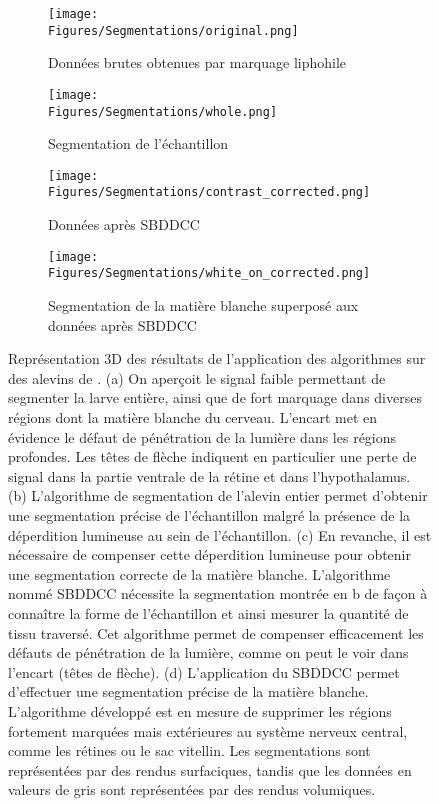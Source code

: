 \documentclass[\main/main.tex]{subfiles}
\begin{document}
\begin{figure}[h!]
    \centering
    \begin{subfigure}[b]{0.45\textwidth}
       \caption{
            \label{fig:lempereur_info:brut}
            Données brutes obtenues par marquage liphohile
            }
       \centering \texttt{[image: \\Figures/Segmentations/original.png]}
    \end{subfigure}
    \begin{subfigure}[b]{0.45\textwidth}
       \caption{
        \label{fig:lempereur_info:whole}
        Segmentation de l'échantillon
        }
       \centering \texttt{[image: \\Figures/Segmentations/whole.png]}
    \end{subfigure}
    \begin{subfigure}[b]{0.45\textwidth}
       \caption{
           \label{fig:lempereur_info:correction}
           Données après SBDDCC
        }
       \centering \texttt{[image: \\Figures/Segmentations/contrast\_corrected.png]}
    \end{subfigure}
    \begin{subfigure}[b]{0.45\textwidth}
       \caption{
           \label{fig:lempereur_info:white}
            Segmentation de la matière blanche superposé aux données après SBDDCC
            }
       \centering \texttt{[image: \\Figures/Segmentations/white\_on\_corrected.png]}
    \end{subfigure}
    \caption{
        \label{fig:lempereur_info}
        Représentation 3D des résultats de l'application des algorithmes sur des alevins de \pz{}.
        \newline
        (a) On aperçoit le signal faible permettant de segmenter la larve entière, ainsi que de fort marquage dans diverses régions dont la matière blanche du cerveau. L'encart met en évidence le défaut de pénétration de la lumière dans les régions profondes. Les têtes de flèche indiquent en particulier une perte de signal dans la partie ventrale de la rétine et dans l'hypothalamus.
        (b) L'algorithme de segmentation de l'alevin entier permet d'obtenir une segmentation précise de l'échantillon malgré la présence de la déperdition lumineuse au sein de l'échantillon.
        (c)
        En revanche, il est nécessaire de compenser cette déperdition lumineuse pour obtenir une segmentation correcte de la matière blanche. L'algorithme nommé SBDDCC nécessite la segmentation  montrée en b de façon à connaître la forme de l'échantillon et ainsi mesurer la quantité de tissu traversé.
        Cet algorithme permet de compenser efficacement les défauts de pénétration de la lumière, comme on peut le voir dans l'encart (têtes de flèche).
        (d) L'application du SBDDCC permet d'effectuer une segmentation précise de la matière blanche. L'algorithme développé est en mesure de supprimer les régions fortement marquées mais extérieures au système nerveux central, comme les rétines ou le sac vitellin.
        \newline
        Les segmentations sont représentées par des rendus surfaciques, tandis que les données en valeurs de gris sont représentées par des rendus volumiques.
    }
    
\end{figure}
\end{document}

